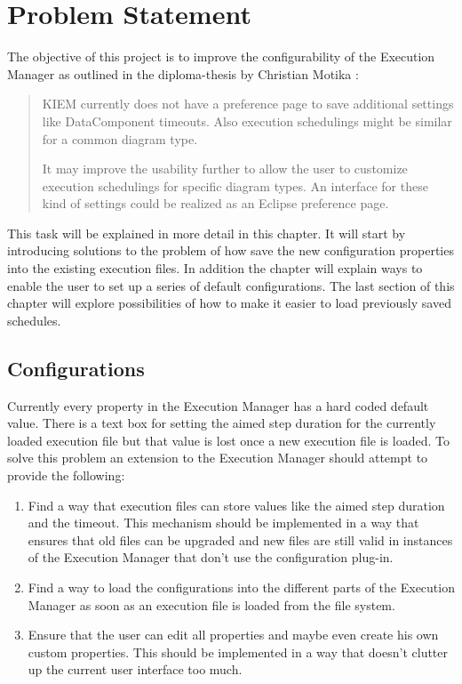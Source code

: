 \chapter{Problem Statement}
\label{chapter:ConfTask}
The objective of this project is to improve the configurability of the
Execution Manager as outlined in the diploma-thesis by Christian Motika\cite{cmot-dt} :
\begin{quote}
 \ac{KIEM} currently does not have a preference page to save
additional settings like DataComponent timeouts. Also execution schedulings
might be similar for a common diagram type.

It may improve the usability further to allow the user to customize execution
schedulings for specific diagram types. An interface for these kind of settings
could be realized as an Eclipse preference page.
\end{quote}

This task will be explained in more detail in this chapter. It will start by introducing 
solutions to the problem of how save the new configuration properties into the existing 
execution files. In addition the chapter will explain ways to enable the user to set up a 
series of default configurations. The last section of this chapter will explore 
possibilities of how to make it easier to load previously saved schedules.

\section{Configurations}
\label{section:ConfTaskConfig}
Currently every property in the Execution Manager has a hard coded default value. There is a text box
for setting the aimed step duration for the currently loaded execution file but that value
is lost once a new execution file is loaded.
To solve this problem an extension to the Execution Manager should attempt to provide the following:
\begin{enumerate}
 \item Find a way that execution files can store values like the aimed step duration and the timeout.
This mechanism should be implemented in a way that ensures that old files can be upgraded and new
files are still valid in instances of the Execution Manager that don't use the configuration plug-in.
 \item Find a way to load the configurations into the different parts of the Execution Manager as soon as an
execution file is loaded from the file system.
 \item Ensure that the user can edit all properties and maybe even create his own custom properties.
This should be implemented in a way that doesn't clutter up the current user interface too much.
\end{enumerate}

